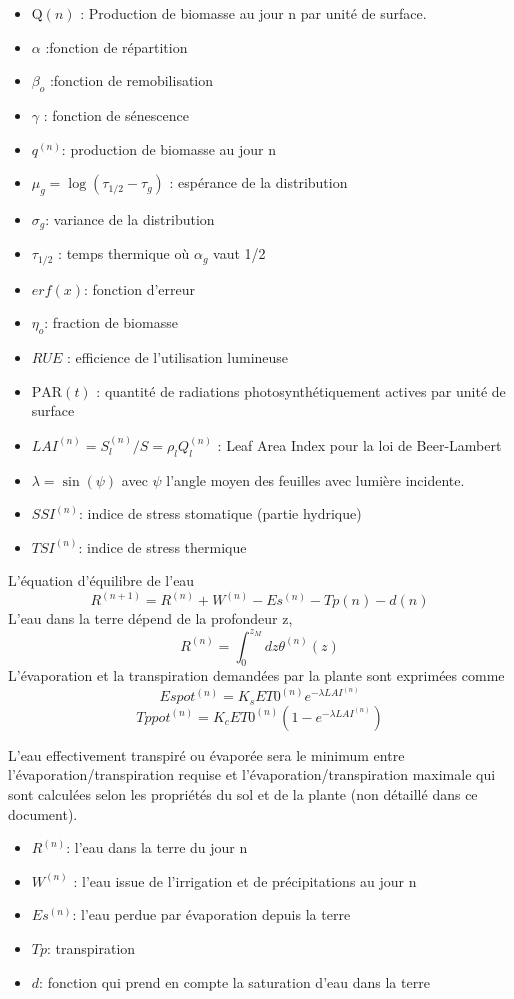 \begin{itemize}
\item $\mathrm{Q}(n)$ : Production de biomasse au jour n par unité de surface.
\item $\alpha$  :fonction de répartition
\item $\beta_o$  :fonction de remobilisation
\item $\gamma$ : fonction de sénescence
\item $q^{(n)}$: production de biomasse au jour n 
\item $\mu_g=\log (\tau_{1/2}-\tau_g)$ : espérance de la distribution
\item $\sigma_g$: variance de la distribution
\item $\tau_{1/2}$ : temps thermique où $\alpha_g$ vaut 1/2
\item $erf(x)$: fonction d'erreur
\item $\eta_o$: fraction de biomasse 
\item $RUE$ : efficience de l'utilisation lumineuse
\item $\mathrm{PAR}(t)$ : quantité de radiations photosynthétiquement actives par unité de surface
\item $LAI^{(n)} = S^{(n)}_l/S = \rho_l Q^{(n)}_l $ : Leaf Area Index pour la loi de Beer-Lambert 
\item $\lambda = \sin(\psi)$ avec $\psi$ l'angle moyen des feuilles avec lumière incidente. 
\item $SSI^{(n)}$: indice de stress stomatique (partie hydrique)
\item $TSI^{(n)}$: indice de stress thermique
\end{itemize}
L'équation d'équilibre de l'eau
\[ {R^{(n+1)}}=R^{(n)}+W^{(n)}-Es^{(n)}-Tp{(n)}-d{(n)}\]
L'eau dans la terre dépend de la profondeur z,
\[ {R^{(n)}}=\int_0^{z_M}dz \theta^{(n)}(z) \]
L'évaporation et la transpiration demandées par la plante sont exprimées comme
\[ {Espot^{(n)}}=K_sET0^{(n)}e^{-\lambda LAI^{(n)}}\]
\[ {Tppot^{(n)}}=K_cET0^{(n)}(1-e^{-\lambda LAI^{(n)}})\]

L'eau effectivement transpiré ou évaporée sera le minimum  entre l'évaporation/transpiration requise et l'évaporation/transpiration maximale qui sont calculées selon les propriétés du sol et de la plante (non détaillé dans ce document).

\begin{itemize}
\item $R^{(n)}$: l'eau dans la terre du jour n
\item $W^{(n)}$ : l'eau issue de l'irrigation et de  précipitations au jour n
\item $Es^{(n)}$: l'eau perdue par évaporation depuis la terre
\item $Tp$: transpiration
\item $d$: fonction qui prend en compte la saturation d'eau dans la terre
\end{itemize}